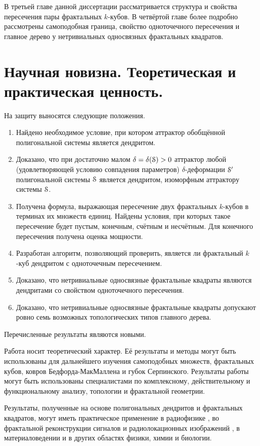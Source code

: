 В третьей главе данной диссертации рассматривается структура и свойства пересечения пары фрактальных $k$-кубов.
В четвёртой главе более подробно рассмотрены самоподобная граница, свойство одноточечного пересечения и главное дерево у нетривиальных односвязных фрактальных квадратов.


\section{Научная новизна. Теоретическая и практическая ценность.}

На защиту выносятся следующие положения.

\begin{enumerate}
\item Найдено необходимое условие, при котором аттрактор обобщённой полигональной системы является дендритом.
\item Доказано, что при достаточно малом $\delta=\delta({\EuScript S})>0$ аттрактор любой (удовлетворяющей условию совпадения параметров) $\delta$-деформации ${\EuScript S}'$ полигональной системы ${\EuScript S}$ является дендритом, изоморфным аттрактору системы ${\EuScript S}$.
\item Получена формула, выражающая пересечение двух фрактальных $k$-кубов в терминах их множеств единиц.
Найдены условия, при которых такое пересечение будет пустым, конечным, счётным и несчётным.
Для конечного пересечения получена оценка мощности.
\item Разработан алгоритм, позволяющий проверить, является ли фрактальный $k$-куб дендритом с одноточечным пересечением.
\item Доказано, что нетривиальные односвязные фрактальные квадраты являются дендритами со свойством одноточечного пересечения.
\item Доказано, что нетривиальные односвязные фрактальные квадраты допускают ровно семь возможных топологических типов главного дерева.
\end{enumerate}

Перечисленные результаты являются новыми.

Работа носит теоретический характер.
Её результаты и методы могут быть использованы для дальнейшего изучения самоподобных множеств, фрактальных кубов, ковров Бедфорда-МакМаллена и губок Серпинского.
Результаты работы могут быть использованы специалистами по комплексному, действительному и функциональному анализу, топологии и фрактальной геометрии.

Результаты, полученные на основе полигональных дендритов и фрактальных квадратов, могут иметь практическое применение в радиофизике \cite{Pot2005, Pot2017}, во фрактальной реконструкции сигналов и радиолокационных изображений \cite{Pot2023, Pot2024}, в материаловедении \cite{Jana2017} и в других областях физики, химии и биологии.


